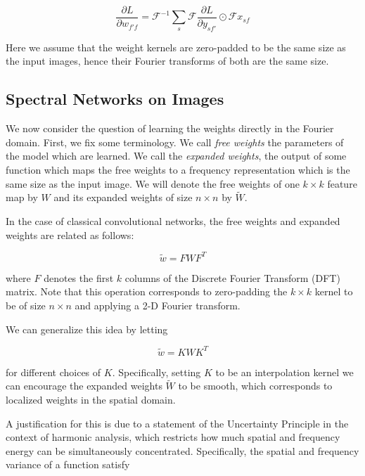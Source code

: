 \documentclass{article}
\begin{document}
\begin{equation}
 \frac{\partial L}{\partial w_{f'f}} = \mathcal{F}^{-1}\sum_{s} \mathcal{F}\frac{\partial L}{\partial y_{sf'}} \odot \mathcal{F}x_{sf}
\end{equation}

Here we assume that the weight kernels are zero-padded to be the same size as the input images, hence their Fourier transforms of both are the same size. 

\subsection{Spectral Networks on Images}

We now consider the question of learning the weights directly in the Fourier domain.
First, we fix some terminology. We call \textit{free weights} the parameters of the model which are learned. 
We call the \textit{expanded weights}, the output of some function which maps the free weights to a frequency representation which is the same size as the input image.
We will denote the free weights of one $k \times k$ feature map by $W$ and its expanded weights of size $n \times n$ by $\tilde{W}$.

In the case of classical convolutional networks, the free weights and expanded weights are related as follows:

\begin{equation}
 \tilde{w} = F W F^T
\end{equation}

where $F$ denotes the first $k$ columns of the Discrete Fourier Transform (DFT) matrix.
Note that this operation corresponds to zero-padding the $k \times k$ kernel to be of size $n \times n$ and applying a 2-D Fourier transform. 

We can generalize this idea by letting 

\begin{equation}
 \tilde{w} = K W K^T
\end{equation}

for different choices of $K$. Specifically, setting $K$ to be an interpolation kernel we can encourage the expanded weights $\tilde{W}$ to be smooth, which corresponds to localized weights in the spatial domain.

A justification for this is due to a statement of the Uncertainty Principle in the context of harmonic analysis, which restricts how much spatial and frequency energy can be simultaneously concentrated. 
Specifically, the spatial and frequency variance of a function satisfy
\end{document}
